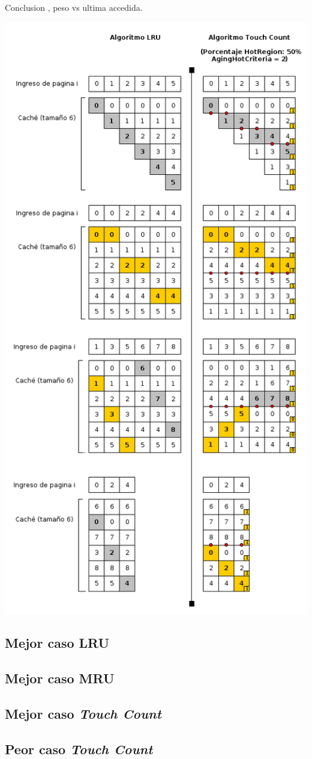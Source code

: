 \documentclass[11pt, a4paper, spanish]{article}
\begin{document}
Conclusion , peso vs ultima accedida.

	\begin{center}
	\includegraphics[scale=0.65]{diagramas/LRUvsTouchCountAll.png}\\
	\end{center}


	\subsection{ Mejor caso LRU}
	\subsection{ Mejor caso MRU}
	\subsection{ Mejor caso \textit{Touch Count}}
	\subsection{ Peor caso \textit{Touch Count}}
\end{document}
